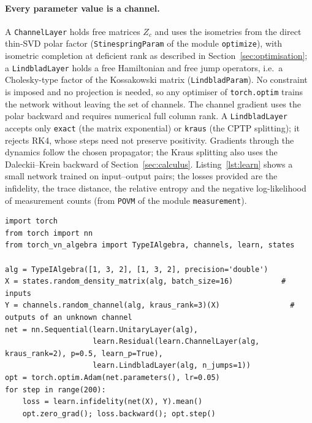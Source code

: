 \documentclass[11pt]{article}
\newcommand{\M}{\mathcal{M}}
\begin{document}
\paragraph{Every parameter value is a channel.} A \texttt{ChannelLayer} holds free matrices $Z_c$ and uses the
isometries from the direct thin-SVD polar factor (\texttt{StinespringParam} of the module \texttt{optimize}), with
isometric completion at deficient rank as described in Section~\ref{sec:optimisation}; a
\texttt{LindbladLayer} holds a free Hamiltonian and free jump operators, i.e.\ a Cholesky-type factor of the
Kossakowski matrix (\texttt{LindbladParam}). No constraint is imposed and no projection is needed, so any
optimiser of \texttt{torch.optim} trains the network without leaving the set of channels. The channel gradient uses
the polar backward and requires numerical full column rank. A \texttt{LindbladLayer} accepts only \texttt{exact}
(the matrix exponential) or \texttt{kraus} (the CPTP splitting); it rejects RK4, whose steps need not preserve
positivity. Gradients through the dynamics follow the chosen propagator; the Kraus splitting also uses the
Daleckii--Krein backward of Section~\ref{sec:calculus}. Listing~\ref{lst:learn} shows
a small network trained on input--output pairs; the losses provided are the infidelity, the trace distance, the
relative entropy and the negative log-likelihood of measurement counts (from \texttt{POVM} of the module
\texttt{measurement}).

\begin{lstlisting}[float=t, caption={A network of channels of $\M=M_1\oplus M_3\oplus M_2$, trained end to end with
\texttt{torch.optim}. Every iterate is a channel.}, label=lst:learn]
import torch
from torch import nn
from torch_vn_algebra import TypeIAlgebra, channels, learn, states

alg = TypeIAlgebra([1, 3, 2], [1, 3, 2], precision='double')
X = states.random_density_matrix(alg, batch_size=16)           # inputs
Y = channels.random_channel(alg, kraus_rank=3)(X)                # outputs of an unknown channel
net = nn.Sequential(learn.UnitaryLayer(alg),
                    learn.Residual(learn.ChannelLayer(alg, kraus_rank=2), p=0.5, learn_p=True),
                    learn.LindbladLayer(alg, n_jumps=1))
opt = torch.optim.Adam(net.parameters(), lr=0.05)
for step in range(200):
    loss = learn.infidelity(net(X), Y).mean()
    opt.zero_grad(); loss.backward(); opt.step()
\end{lstlisting}
\end{document}
